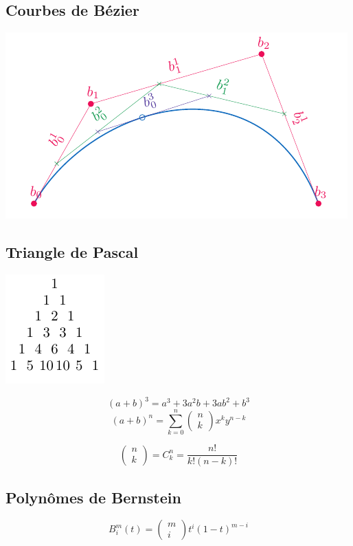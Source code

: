 \documentclass[]{article}
\begin{document}
\begin{multicols}{3}
\section{Courbes de Bézier}
\begin{center}
\includegraphics[width=0.6\columnwidth,page=1]{drwg_0.pdf}
\end{center}
\subsection{Triangle de Pascal}
\begin{center}
\includegraphics[scale=1,page=1]{drwg_1.pdf}
\end{center}
$$(a+b)^3=a^3+3a^2b+3ab^2+b^3$$
$$(a+b)^n=\sum_{k=0}^{n}\begin{pmatrix}
n\\k
\end{pmatrix}x^ky^{n-k}$$

$$\begin{pmatrix}
n\\ k
\end{pmatrix}=C^{n}_{k}=\frac{n!}{k!(n-k)!}$$
\subsection{Polynômes de Bernstein}
$$B_{i}^{m}(t)=\begin{pmatrix}m\\i\end{pmatrix}t^{i}(1-t)^{m-i}$$

\end{multicols}
\end{document}
